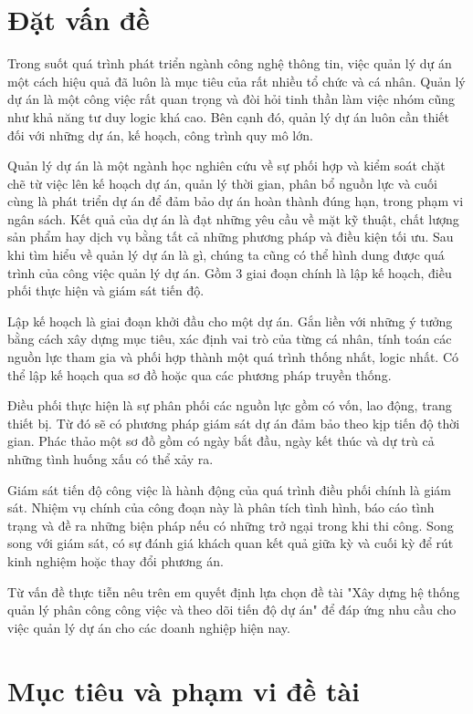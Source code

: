 \documentclass[../DoAn.tex]{subfiles}
\begin{document}
\section{Đặt vấn đề}
\label{section:1.1}

Trong suốt quá trình phát triển ngành công nghệ thông tin, việc quản lý dự án một cách hiệu quả đã luôn là mục tiêu của rất nhiều tổ chức và cá nhân.
Quản lý dự án là một công việc rất quan trọng và đòi hỏi tinh thần làm việc nhóm cũng như khả năng tư duy logic khá cao. Bên cạnh đó, quản lý dự án luôn cần thiết đối với những dự án, kế hoạch, công trình quy mô lớn.

Quản lý dự án là một ngành học nghiên cứu về sự phối hợp và kiểm soát chặt chẽ từ việc lên kế hoạch dự án, quản lý thời gian, phân bổ nguồn lực và cuối cùng là phát triển dự án để đảm bảo dự án hoàn thành đúng hạn,
trong phạm vi ngân sách. Kết quả của dự án là đạt những yêu cầu về mặt kỹ thuật, chất lượng sản phẩm hay dịch vụ bằng tất cả những phương pháp và điều kiện tối ưu. Sau khi tìm hiểu về quản lý dự án là gì,
chúng ta cũng có thể hình dung được quá trình của công việc quản lý dự án. Gồm 3 giai đoạn chính là lập kế hoạch, điều phối thực hiện và giám sát tiến độ.

Lập kế hoạch là giai đoạn khởi đầu cho một dự án. Gắn liền với những ý tưởng bằng cách xây dựng mục tiêu, xác định vai trò của từng cá nhân, tính toán các nguồn lực tham gia và phối hợp thành một quá trình thống nhất, logic nhất.
Có thể lập kế hoạch qua sơ đồ hoặc qua các phương pháp truyền thống.

Điều phối thực hiện là sự phân phối các nguồn lực gồm có vốn, lao động, trang thiết bị. Từ đó sẽ có phương pháp giám sát dự án đảm bảo theo kịp tiến độ thời gian.
Phác thảo một sơ đồ gồm có ngày bắt đầu, ngày kết thúc và dự trù cả những tình huống xấu có thể xảy ra.

Giám sát tiến độ công việc là hành động của quá trình điều phối chính là giám sát. Nhiệm vụ chính của công đoạn này là phân tích tình hình, báo cáo tình trạng
và đề ra những biện pháp nếu có những trở ngại trong khi thi công. Song song với giám sát, có sự đánh giá khách quan kết quả giữa kỳ và cuối kỳ để rút kinh nghiệm hoặc thay đổi phương án.

Từ vấn đề thực tiễn nêu trên em quyết định lựa chọn đề tài "Xây dựng hệ thống quản lý phân công công việc và theo dõi tiến độ dự án" để đáp ứng nhu cầu cho việc quản lý dự án cho các doanh nghiệp hiện nay.

\section{Mục tiêu và phạm vi đề tài}
\label{section:1.2}
\end{document}
